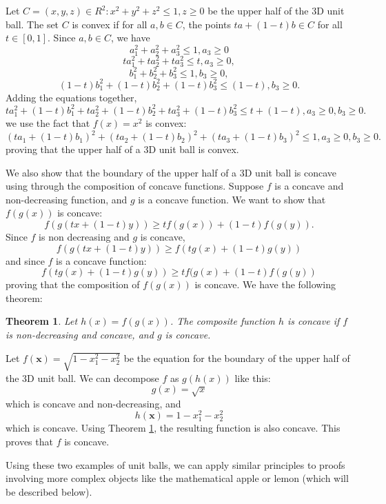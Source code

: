 \documentclass[12pt]{article}
\numberwithin{equation}{section}
\numberwithin{figure}{section}
\numberwithin{table}{section}
\newtheorem{theorem}{Theorem}[section]
\theoremstyle{definition}
\theoremstyle{remark}
\numberwithin{equation}{section}
\begin{document}
Let $C = {(x, y, z) \in R^{2}: x^{2} + y^{2} + z^{2} \leq 1, z \geq 0}$ be the upper half of the 3D unit ball. The set $C$ is convex if for all $a, b \in C$, the points $ta + (1 - t)b \in C$ for all $t \in [0, 1]$. Since $a, b \in C$, we have
\[
a_{1}^{2} + a_{2}^{2} + a_{3}^{2} \leq 1, a_{3} \geq 0
\]
\[
ta_{1}^{2} + ta_{2}^{2} + ta_{3}^{2} \leq t, a_{3} \geq 0,
\]
\[
b_{1}^{2} + b_{2}^{2} + b_{3}^{2} \leq 1, b_{3} \geq 0,
\]
\[
(1 - t)b_{1}^{2} + (1 - t)b_{2}^{2} + (1 - t)b_{3}^{2} \leq (1 - t), b_{3} \geq 0.
\]
Adding the equations together,
\[
ta_{1}^{2} + (1 - t)b_{1}^{2} + ta_{2}^{2} + (1 - t)b_{2}^{2} + ta_{3}^{2} + (1 - t)b_{3}^{2} \leq t + (1 - t), a_{3} \geq 0, b_{3} \geq 0.
\]
we use the fact that $f(x) = x^{2}$ is convex:
\[
(ta_{1} + (1 - t)b_{1})^{2} + (ta_{2} +  (1 - t)b_{2})^{2} + (ta_{3} +  (1 - t)b_{3})^{2} \leq 1, a_{3} \geq 0, b_{3} \geq 0.
\]
proving that the upper half of a 3D unit ball is convex.

We also show that the boundary of the upper half of a 3D unit ball is concave using through the composition of concave functions. Suppose $f$ is a concave and non-decreasing function, and $g$ is a concave function. We want to show that $f(g(x))$ is concave:
\[
f(g(tx + (1 - t)y)) \geq tf(g(x)) + (1 - t)f(g(y)).
\]
Since $f$ is non decreasing and $g$ is concave,
\[
f(g(tx + (1 - t)y)) \geq f(tg(x) + (1 - t)g(y))
\]
and since $f$ is a concave function:
\[
f(tg(x) + (1 - t)g(y)) \geq tf(g(x) + (1 - t)f(g(y))
\]
proving that the composition of $f(g(x))$ is concave. We have the following theorem:
\begin{theorem}
	\label{theorem:concavecomposition}
	Let $h(x) = f(g(x))$. The composite function $h$ is concave if $f$ is non-decreasing and concave, and $g$ is concave.
\end{theorem}

Let $f(\mathbf{x}) = \sqrt{1- x_{1}^{2} - x_{2}^{2}}$ be the equation for the boundary of the upper half of the 3D unit ball. We can decompose $f$ as $g(h(x))$ like this:
\[
g(x) = \sqrt{x}
\]
which is concave and non-decreasing, and 
\[
h(\mathbf{x}) = 1- x_{1}^{2} - x_{2}^{2}
\]
which is concave. Using Theorem \ref{theorem:concavecomposition}, the resulting function is also concave. This proves that $f$ is concave.

Using these two examples of unit balls, we can apply similar principles to proofs involving more complex objects like the mathematical apple or lemon (which will be described below).
\end{document}

